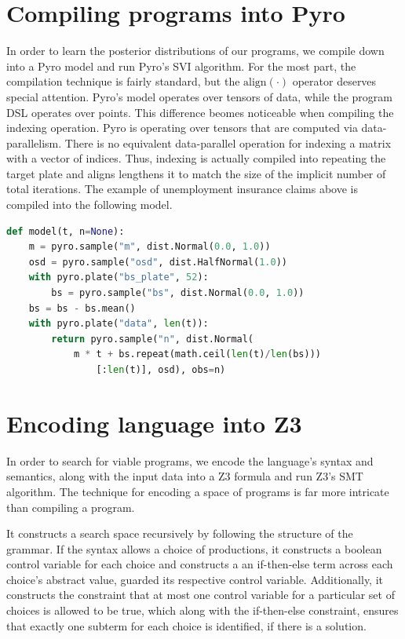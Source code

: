\documentclass[runningheads]{llncs}
\begin{document}
\section{Compiling programs into Pyro}
In order to learn the posterior distributions of our programs, we compile down into  
a Pyro model and run Pyro's SVI algorithm. For the most part, the compilation technique
is fairly standard, but the $\text{align}(\cdot)$ operator deserves special attention. 
Pyro's model operates over tensors of data, while the program DSL operates over points. 
This difference beomes noticeable when compiling the indexing operation. Pyro is
operating over tensors that are computed via data-parallelism. There is no
equivalent data-parallel operation for indexing a matrix with a vector of indices.
Thus, indexing is actually compiled into repeating the target plate and aligns lengthens it
to match the size of the implicit number of total iterations.    
The example of unemployment insurance claims above is compiled into the following model.

\begin{lstlisting}[language=Python]
def model(t, n=None):
    m = pyro.sample("m", dist.Normal(0.0, 1.0))
    osd = pyro.sample("osd", dist.HalfNormal(1.0))
    with pyro.plate("bs_plate", 52):
        bs = pyro.sample("bs", dist.Normal(0.0, 1.0))
    bs = bs - bs.mean()
    with pyro.plate("data", len(t)):
        return pyro.sample("n", dist.Normal(
            m * t + bs.repeat(math.ceil(len(t)/len(bs)))
                [:len(t)], osd), obs=n)
\end{lstlisting}


\section{Encoding language into Z3}
In order to search for viable programs, we encode the language's syntax and semantics, 
along with the input data into a Z3 formula and run Z3's SMT algorithm.
The technique for encoding a space of programs is far more intricate than compiling a program.

It constructs a search space recursively by following the structure of the grammar. 
If the syntax allows a choice of productions, it constructs a boolean control variable for each choice
and constructs a an if-then-else term across each choice's abstract value, guarded its respective control variable. 
Additionally, it constructs the constraint that at most one control variable for a particular set of choices    
is allowed to be true, which along with the if-then-else constraint, ensures
that exactly one subterm for each choice is identified, if there is a solution.  
\end{document}
